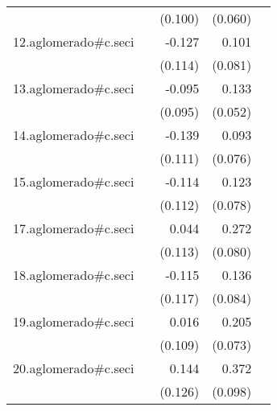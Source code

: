{\begin{longtable}{l*{4}{D{.}{.}{-1}}}
            &                     &     (0.100)         &     (0.060)         &                     \\
\addlinespace
12.aglomerado#c.seci&                     &      -0.127         &       0.101         &                     \\
            &                     &     (0.114)         &     (0.081)         &                     \\
\addlinespace
13.aglomerado#c.seci&                     &      -0.095         &       0.133\sym{*}  &                     \\
            &                     &     (0.095)         &     (0.052)         &                     \\
\addlinespace
14.aglomerado#c.seci&                     &      -0.139         &       0.093         &                     \\
            &                     &     (0.111)         &     (0.076)         &                     \\
\addlinespace
15.aglomerado#c.seci&                     &      -0.114         &       0.123         &                     \\
            &                     &     (0.112)         &     (0.078)         &                     \\
\addlinespace
17.aglomerado#c.seci&                     &       0.044         &       0.272\sym{***}&                     \\
            &                     &     (0.113)         &     (0.080)         &                     \\
\addlinespace
18.aglomerado#c.seci&                     &      -0.115         &       0.136         &                     \\
            &                     &     (0.117)         &     (0.084)         &                     \\
\addlinespace
19.aglomerado#c.seci&                     &       0.016         &       0.205\sym{**} &                     \\
            &                     &     (0.109)         &     (0.073)         &                     \\
\addlinespace
20.aglomerado#c.seci&                     &       0.144         &       0.372\sym{***}&                     \\
            &                     &     (0.126)         &     (0.098)         &                     \\

\end{longtable}}
